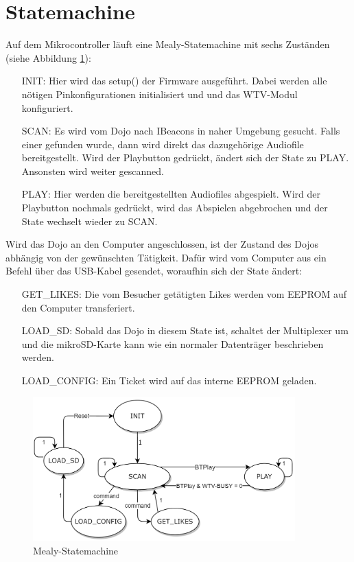 \section{Statemachine}
Auf dem Mikrocontroller läuft eine Mealy-Statemachine mit sechs Zuständen (siehe Abbildung \ref{fig:mealy_statemachine}):\\
\begin{itemize}[leftmargin=3.2cm]
\item[INIT:] Hier wird das setup() der Firmware ausgeführt. Dabei werden alle nötigen Pinkonfigurationen initialisiert und und das WTV-Modul konfiguriert.
\item[SCAN:] Es wird vom Dojo nach IBeacons in naher Umgebung gesucht. Falls einer gefunden wurde, dann wird direkt das dazugehörige Audiofile bereitgestellt. Wird der Playbutton gedrückt, ändert sich der State zu PLAY. Ansonsten wird weiter gescanned.
\item[PLAY:] Hier werden die bereitgestellten Audiofiles abgespielt. Wird der Playbutton nochmals gedrückt, wird das Abspielen abgebrochen und der State wechselt wieder zu SCAN.
\end{itemize}
Wird das Dojo an den Computer angeschlossen, ist der Zustand des Dojos abhängig von der gewünschten Tätigkeit. Dafür wird vom Computer aus ein Befehl über das USB-Kabel gesendet, woraufhin sich der State ändert:
\begin{itemize}[leftmargin=3.2cm]
\item[GET\_LIKES:] Die vom Besucher getätigten Likes werden vom EEPROM auf den Computer transferiert.
\item[LOAD\_SD:] Sobald das Dojo in diesem State ist, schaltet der Multiplexer um und die mikroSD-Karte kann wie ein normaler Datenträger beschrieben werden.
\item[LOAD\_CONFIG:] Ein Ticket wird auf das interne EEPROM geladen.
\end{itemize}
\begin{figure}[h]
\centering
\includegraphics[width=0.9\textwidth]{Bilder/statemachine.PNG} 
\caption{Mealy-Statemachine}
\label{fig:mealy_statemachine}
\end{figure}
\newpage
